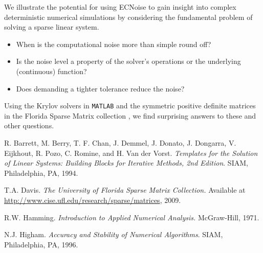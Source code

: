 \documentclass{report}
\begin{document}
We illustrate the potential for using \textsf{ECNoise} to gain insight
into complex deterministic numerical simulations by considering the
fundamental problem of solving a sparse linear system.
\begin{itemize}
\item When is the computational noise more than simple round off?
\item Is the noise level a property of the solver's operations or the
underlying (continuous) function?
\item Does demanding a tighter tolerance reduce the noise?
\end{itemize}
Using the Krylov solvers in \texttt{MATLAB} \cite{linearsys} and the
symmetric positive definite matrices in the Florida Sparse Matrix
collection \cite{ufmatrices}, we find surprising answers to these and
other questions.

\begin{thebibliography}
 R. Barrett, M. Berry, T. F. Chan, J. Demmel, J.
Donato, J. Dongarra, V. Eijkhout, R. Pozo, C. Romine, and H. Van der
Vorst. {\em Templates for the Solution of Linear Systems: Building Blocks
for Iterative Methods, 2nd Edition}. SIAM, Philadelphia, PA, 1994.

 T.A. Davis. {\em The University of Florida Sparse
Matrix Collection.} Available at
\url{http://www.cise.ufl.edu/research/sparse/matrices}, 2009.

 R.W. Hamming. {\em Introduction to Applied
Numerical Analysis.} McGraw-Hill, 1971.

 N.J. Higham. {\em Accuracy and Stability of
Numerical Algorithms}. SIAM, Philadelphia, PA, 1996.
\end{thebibliography}
\end{document}

